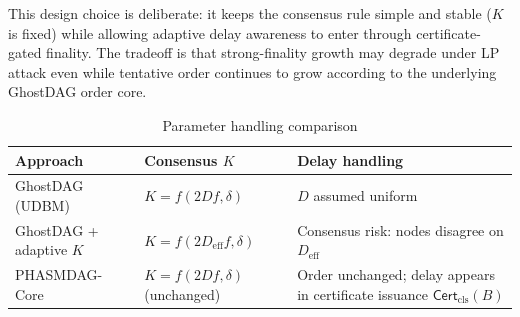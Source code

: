 \documentclass[11pt]{article}
\theoremstyle{definition}
\theoremstyle{plain}
\theoremstyle{remark}
\newcommand{\Certcls}{\mathsf{Cert}_{\mathrm{cls}}}
\begin{document}
This design choice is deliberate: it keeps the consensus rule simple and
stable ($K$ is fixed) while allowing adaptive delay awareness to enter through
certificate-gated finality.  The tradeoff is that strong-finality growth may
degrade under LP attack even while tentative order continues to grow according
to the underlying GhostDAG order core.

\begin{table}[H]
\centering
\caption{Parameter handling comparison}
\label{tab:k_comparison}
\small
\renewcommand{\arraystretch}{1.1}
\begin{tabularx}{0.98\textwidth}{@{}L{3.8cm}YY@{}}
\toprule
\textbf{Approach} & \textbf{Consensus $K$} & \textbf{Delay handling} \\
\midrule
GhostDAG (UDBM) & $K = f(2Df,\delta)$ & $D$ assumed uniform \\
GhostDAG + adaptive $K$ & $K = f(2D_{\mathrm{eff}}f,\delta)$ & Consensus risk: nodes disagree on $D_{\mathrm{eff}}$ \\
PHASMDAG-Core & $K = f(2Df,\delta)$ (unchanged) & Order unchanged; delay appears in certificate issuance $\Certcls(B)$ \\
\bottomrule
\end{tabularx}
\end{table}
\end{document}
